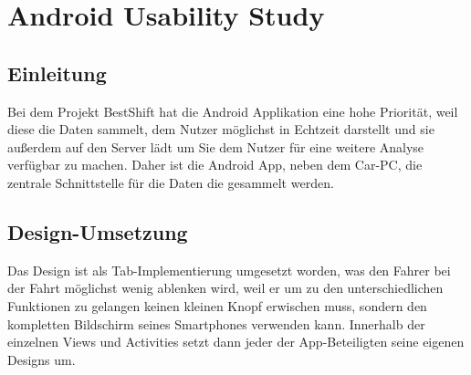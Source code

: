 \chapter{Android Usability Study}
\section{Einleitung}
Bei dem Projekt BestShift hat die Android Applikation eine hohe Priorität, weil diese die Daten sammelt, dem Nutzer möglichst in Echtzeit darstellt und sie außerdem auf den Server lädt um Sie dem Nutzer für eine weitere Analyse verfügbar zu machen. 
Daher ist die Android App, neben dem Car-PC, die zentrale Schnittstelle für die Daten die gesammelt werden. 

\section{Design-Umsetzung}
Das Design ist als Tab-Implementierung umgesetzt worden, was den Fahrer bei der Fahrt möglichst wenig ablenken wird, weil er um zu den unterschiedlichen Funktionen zu gelangen keinen kleinen Knopf erwischen muss, sondern den kompletten Bildschirm seines Smartphones verwenden kann. Innerhalb der einzelnen Views und Activities setzt dann jeder der App-Beteiligten seine eigenen Designs um. 

